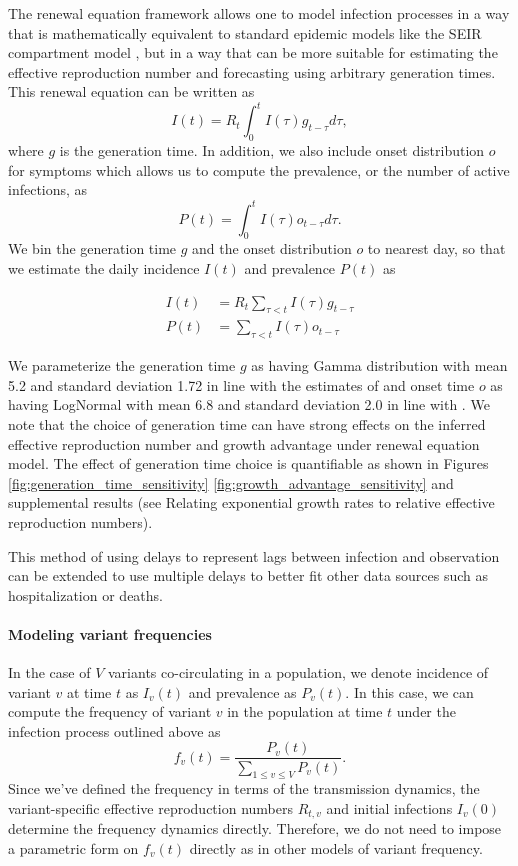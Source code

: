\documentclass[11pt,oneside,letterpaper]{article}
\begin{document}
The renewal equation framework allows one to model infection processes in a way that is mathematically equivalent to standard epidemic models like the SEIR compartment model \cite{Champredon2018}, but in a way that can be more suitable for estimating the effective reproduction number and forecasting using arbitrary generation times. This renewal equation can be written as
\begin{equation}
  I(t) = R_{t} \int_{0}^{t} I(\tau)g_{t-\tau} d\tau,
\end{equation}
where $g$ is the generation time.
In addition, we also include onset distribution $o$ for symptoms which allows us to compute the prevalence, or the number of active infections, as
\begin{equation}
  P(t) = \int_{0}^{t} I(\tau) o_{t-\tau} d \tau.
\end{equation}
We bin the generation time $g$ and the onset distribution $o$ to nearest day, so that we estimate the daily incidence $I(t)$ and prevalence $P(t)$ as

\begin{align}
  I(t) &= R_{t} \sum_{\tau < t} I(\tau) g_{t-\tau}\\
  P(t) &= \sum_{\tau < t} I(\tau) o_{t-\tau}
\end{align}

We parameterize the generation time $g$ as having Gamma distribution with mean 5.2 and standard deviation 1.72 in line with the estimates of \cite{Ganyani2020} and onset time $o$ as having LogNormal with mean 6.8 and standard deviation 2.0 in line with \cite{Cheng2021}. 
We note that the choice of generation time can have strong effects on the inferred effective reproduction number and growth advantage under renewal equation model. The effect of generation time choice is quantifiable as shown in Figures \ref{fig:generation_time_sensitivity} \ref{fig:growth_advantage_sensitivity} and supplemental results (see Relating exponential growth rates to relative effective reproduction numbers).

This method of using delays to represent lags between infection and observation can be extended to use multiple delays to better fit other data sources such as hospitalization or deaths.

\paragraph{Modeling variant frequencies}%

In the case of $V$ variants co-circulating in a population, we denote incidence of variant $v$ at time $t$ as $I_{v}(t)$ and prevalence as $P_{v}(t)$.
In this case, we can compute the frequency of variant $v$ in the population at time $t$ under the infection process outlined above as
\begin{equation}
  f_{v}(t) = \frac{P_{v}(t)}{ \sum_{1\leq v \leq V} P_{v}(t)}.
\end{equation}
Since we've defined the frequency in terms of the transmission dynamics, the variant-specific effective reproduction numbers $R_{t,v}$ and initial infections $I_{v}(0)$ determine the frequency dynamics directly.
Therefore, we do not need to impose a parametric form on $f_{v}(t)$ directly as in other models of variant frequency.
\end{document}
